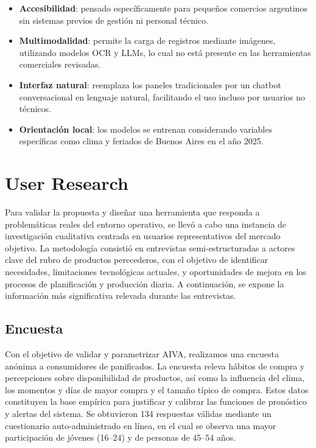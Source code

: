 \begin{itemize}
    \item \textbf{Accesibilidad}: pensado específicamente para pequeños comercios argentinos sin sistemas previos de gestión ni personal técnico.

    \item \textbf{Multimodalidad}: permite la carga de registros mediante imágenes, utilizando modelos OCR y LLMs, lo cual no está presente en las herramientas comerciales revisadas.

    \item \textbf{Interfaz natural}: reemplaza los paneles tradicionales por un chatbot conversacional en lenguaje natural, facilitando el uso incluso por usuarios no técnicos.

    \item \textbf{Orientación local}: los modelos se entrenan considerando variables específicas como clima y feriados de Buenos Aires en el año 2025.
\end{itemize}

\newpage %

\section{User Research}

Para validar la propuesta y diseñar una herramienta que responda a problemáticas reales del entorno operativo, se llevó a cabo una instancia de investigación cualitativa centrada en usuarios representativos del mercado objetivo. La metodología consistió en entrevistas semi-estructuradas a actores clave del rubro de productos perecederos, con el objetivo de identificar necesidades, limitaciones tecnológicas actuales, y oportunidades de mejora en los procesos de planificación y producción diaria. A continuación, se expone la información más significativa relevada durante las entrevistas.

\subsection{Encuesta}

Con el objetivo de validar y parametrizar AIVA, realizamos una encuesta anónima a consumidores de panificados. La encuesta releva hábitos de compra y percepciones sobre disponibilidad de productos, así como la influencia del clima, los momentos y días de mayor compra y el tamaño típico de compra. Estos datos constituyen la base empírica para justificar y calibrar las funciones de pronóstico y alertas del sistema. Se obtuvieron 134 respuestas válidas mediante un cuestionario auto-administrado en línea, en el cual se observa una mayor participación de jóvenes (16–24) y de personas de 45–54 años.

